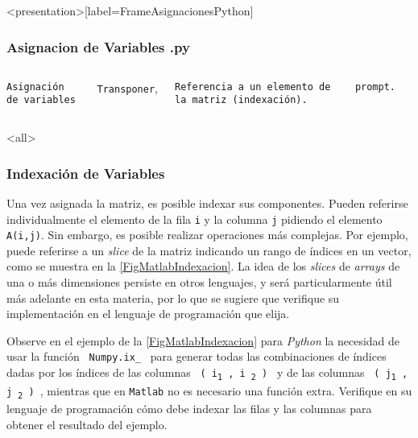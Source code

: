\begin{frame}<presentation>[label=FrameAsignacionesPython]
  \frametitle{Asignacion de Variables .py}
\begin{columns}[T]

 \vspace{0.5cm}

\flushright \texttt{Asignación de variables}

\vspace{1cm}

\hfill \texttt{Transponer},

\vspace{1cm}

\hfill \texttt{Referencia a un elemento de la matriz (indexación).}

\hfill \texttt{prompt.}

\begin{codeblock}
  
\end{codeblock}

\end{columns}

\end{frame}

\mode<all>

\subsubsection{Indexación de Variables}


Una vez asignada la matriz, es posible indexar sus componentes. 
Pueden referirse individualmente el elemento de la fila \texttt{i} y la
columna \texttt{j} pidiendo el elemento \texttt{A(i,j)}. Sin 
embargo, es posible realizar operaciones más complejas. Por ejemplo,
puede referirse a un \emph{slice} de la matriz indicando un rango 
de índices en un vector, como se muestra en la
\autoref{FigMatlabIndexacion}. La idea de los \emph{slices} de \emph{arrays} de una o 
más dimensiones persiste en otros lenguajes, y será particularmente
útil más adelante en esta materia, por lo que se sugiere que
verifique su implementación en el lenguaje de programación 
que elija. 

Observe en el ejemplo de la \autoref{FigMatlabIndexacion} para \emph{Python}
la necesidad de usar la función \texttt{ Numpy.ix\_ } para generar todas las 
combinaciones de índices dadas por los índices de las columnas 
\texttt{ ( i\textsubscript{1} , i \textsubscript{2} ) }
y de las columnas \texttt{ ( j\textsubscript{1} , j \textsubscript{2} ) }, 
mientras que en \texttt{Matlab} no es necesario
una función extra. Verifique en su lenguaje de programación cómo debe indexar 
las filas y las columnas para obtener el resultado del ejemplo. 

